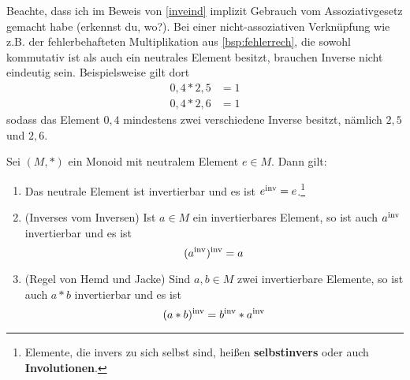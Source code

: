 \begin{bem}[*]
    Beachte, dass ich im Beweis von \cref{inveind} implizit Gebrauch vom Assoziativgesetz gemacht habe (erkennst du, wo?). Bei einer nicht-assoziativen Verknüpfung wie z.B. der fehlerbehafteten Multiplikation aus \cref{bsp:fehlerrech}, die sowohl kommutativ ist als auch ein neutrales Element besitzt, brauchen Inverse nicht eindeutig sein. Beispielsweise gilt dort
    \begin{align*}
        0{,}4 * 2{,}5 & = 1 \\
        0{,}4 * 2{,}6 & = 1
    \end{align*}
    sodass das Element $0{,}4$ mindestens zwei verschiedene Inverse besitzt, nämlich $2{,}5$ und $2{,}6$.
\end{bem}


\begin{satz} \label{regelnfuerinv} 
    Sei $(M,*)$ ein Monoid mit neutralem Element $e\in M$. Dann gilt:
    \begin{enumerate}
        \item Das neutrale Element ist invertierbar und es ist $e^{\mathrm{inv}} = e$.\footnote{Elemente, die invers zu sich selbst sind, heißen \textbf{selbstinvers} oder auch \textbf{Involutionen}.}
        \item(Inverses vom Inversen) Ist $a\in M$ ein invertierbares Element, so ist auch $a^{\mathrm{inv}}$ invertierbar und es ist
            \[(a^{\mathrm{inv}})^{\mathrm{inv}} = a \]
        \item(Regel von Hemd und Jacke) Sind $a,b\in M$ zwei invertierbare Elemente, so ist auch $a*b$ invertierbar und es ist
            \[ (a*b)^{\mathrm{inv}} = b^{\mathrm{inv}} * a^{\mathrm{inv}} \]
    \end{enumerate}
\end{satz}


